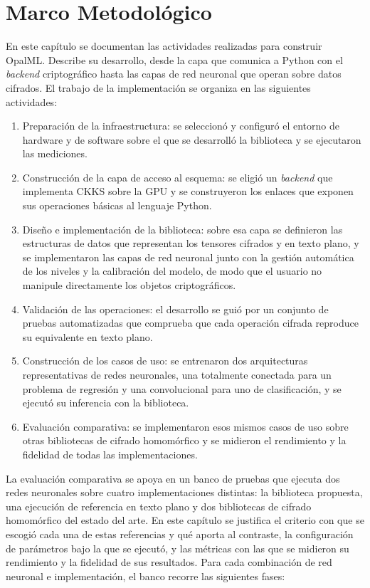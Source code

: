\chapter{Marco Metodológico}

En este capítulo se documentan las actividades realizadas para construir OpalML. Describe su desarrollo, desde la capa que comunica a Python con el \textit{backend} criptográfico hasta las capas de red neuronal que operan sobre datos cifrados. El trabajo de la implementación se organiza en las siguientes actividades:

\begin{enumerate}
    \item Preparación de la infraestructura: se seleccionó y configuró el entorno de hardware y de software sobre el que se desarrolló la biblioteca y se ejecutaron las mediciones.

    \item Construcción de la capa de acceso al esquema: se eligió un \textit{backend} que implementa CKKS sobre la GPU y se construyeron los enlaces que exponen sus operaciones básicas al lenguaje Python.

    \item Diseño e implementación de la biblioteca: sobre esa capa se definieron las estructuras de datos que representan los tensores cifrados y en texto plano, y se implementaron las capas de red neuronal junto con la gestión automática de los niveles y la calibración del modelo, de modo que el usuario no manipule directamente los objetos criptográficos.

    \item Validación de las operaciones: el desarrollo se guió por un conjunto de pruebas automatizadas que comprueba que cada operación cifrada reproduce su equivalente en texto plano.

    \item Construcción de los casos de uso: se entrenaron dos arquitecturas representativas de redes neuronales, una totalmente conectada para un problema de regresión y una convolucional para uno de clasificación, y se ejecutó su inferencia con la biblioteca.

    \item Evaluación comparativa: se implementaron esos mismos casos de uso sobre otras bibliotecas de cifrado homomórfico y se midieron el rendimiento y la fidelidad de todas las implementaciones.
\end{enumerate}

La evaluación comparativa se apoya en un banco de pruebas que ejecuta dos redes neuronales sobre cuatro implementaciones distintas: la biblioteca propuesta, una ejecución de referencia en texto plano y dos bibliotecas de cifrado homomórfico del estado del arte. En este capítulo se justifica el criterio con que se escogió cada una de estas referencias y qué aporta al contraste, la configuración de parámetros bajo la que se ejecutó, y las métricas con las que se midieron su rendimiento y la fidelidad de sus resultados. Para cada combinación de red neuronal e implementación, el banco recorre las siguientes fases:


